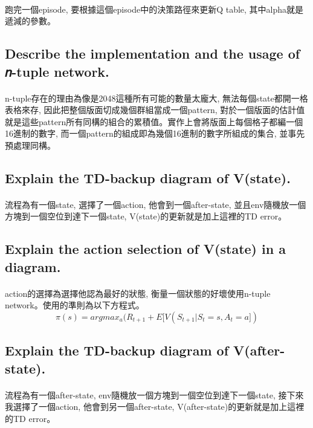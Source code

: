 \paragraph{}
跑完一個episode, 要根據這個episode中的決策路徑來更新Q table, 其中alpha就是遞減的參數。
\subsection{Describe the implementation and the usage of 𝑛-tuple network.}
\paragraph{}
n-tuple存在的理由為像是2048這種所有可能的數量太龐大, 無法每個state都開一格表格來存, 因此把整個版面切成幾個群組當成一個pattern, 對於一個版面的估計值就是這些pattern所有同構的組合的累積值。實作上會將版面上每個格子都編一個16進制的數字, 而一個pattern的組成即為幾個16進制的數字所組成的集合, 並事先預處理同構。
\subsection{Explain the TD-backup diagram of V(state).}
\paragraph{}
流程為有一個state, 選擇了一個action, 他會到一個after-state, 並且env隨機放一個方塊到一個空位到達下一個state, V(state)的更新就是加上這裡的TD error。
\subsection{Explain the action selection of V(state) in a diagram.}
\paragraph{}
action的選擇為選擇他認為最好的狀態, 衡量一個狀態的好壞使用n-tuple network。使用的準則為以下方程式。
$$\pi(s) = argmax_a(R_{t + 1} + E[V(S_{t + 1}|S_t = s, A_t = a])$$
\subsection{Explain the TD-backup diagram of V(after-state).}
\paragraph{}
流程為有一個after-state, env隨機放一個方塊到一個空位到達下一個state, 接下來我選擇了一個action, 他會到另一個after-state, V(after-state)的更新就是加上這裡的TD error。
